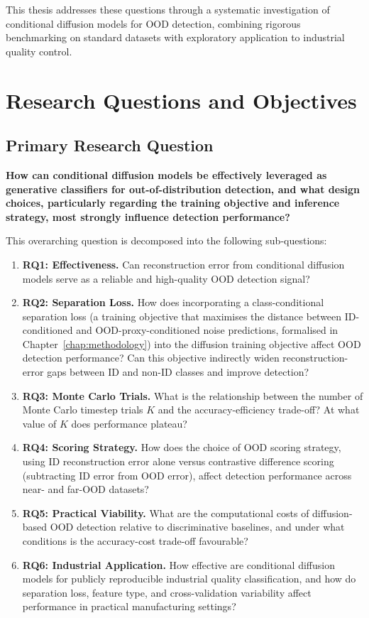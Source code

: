 This thesis addresses these questions through a systematic investigation of conditional diffusion models for OOD detection, combining rigorous benchmarking on standard datasets with exploratory application to industrial quality control.

\endgroup

\section{Research Questions and Objectives}
\label{sec:intro:objectives}
\begingroup
\fontsize{11pt}{13.2pt}\selectfont

\subsection{Primary Research Question}
\label{sec:intro:primary-rq}

\textbf{How can conditional diffusion models be effectively leveraged as generative classifiers for out-of-distribution detection, and what design choices, particularly regarding the training objective and inference strategy, most strongly influence detection performance?}

This overarching question is decomposed into the following sub-questions:

\begin{enumerate}
    \item \textbf{RQ1: Effectiveness.} Can reconstruction error from conditional diffusion models serve as a reliable and high-quality OOD detection signal?
    \item \textbf{RQ2: Separation Loss.} How does incorporating a class-conditional separation loss (a training objective that maximises the distance between ID-conditioned and OOD-proxy-conditioned noise predictions, formalised in Chapter~\ref{chap:methodology}) into the diffusion training objective affect OOD detection performance? Can this objective indirectly widen reconstruction-error gaps between ID and non-ID classes and improve detection?
    \item \textbf{RQ3: Monte Carlo Trials.} What is the relationship between the number of Monte Carlo timestep trials $K$ and the accuracy-efficiency trade-off? At what value of $K$ does performance plateau?
    \item \textbf{RQ4: Scoring Strategy.} How does the choice of OOD scoring strategy, using ID reconstruction error alone versus contrastive difference scoring (subtracting ID error from OOD error), affect detection performance across near- and far-OOD datasets?
    \item \textbf{RQ5: Practical Viability.} What are the computational costs of diffusion-based OOD detection relative to discriminative baselines, and under what conditions is the accuracy-cost trade-off favourable?
    \item \textbf{RQ6: Industrial Application.} How effective are conditional diffusion models for publicly reproducible industrial quality classification, and how do separation loss, feature type, and cross-validation variability affect performance in practical manufacturing settings?
\end{enumerate}

